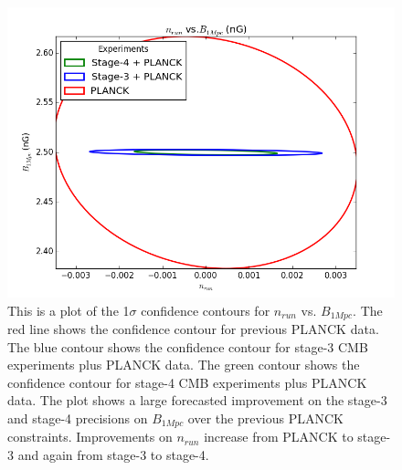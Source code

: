 {{\begin{figure}[h]
\centering
\includegraphics[scale=0.8]{images/contours/nrun.png}
\caption{This is a plot of the 1$\sigma$ confidence contours for $n_{run}$ vs. $B_{1Mpc}$. The red line shows the confidence contour for previous PLANCK data. The blue contour shows the confidence contour for stage-3 CMB experiments plus PLANCK data. The green contour shows the confidence contour for stage-4 CMB experiments plus PLANCK data. The plot shows a large forecasted improvement on the stage-3 and stage-4 precisions on $B_{1Mpc}$ over the previous PLANCK constraints. Improvements on $n_{run}$ increase from PLANCK to stage-3 and again from stage-3 to stage-4.}
\label{fig:nrun}
\end{figure}

}}
